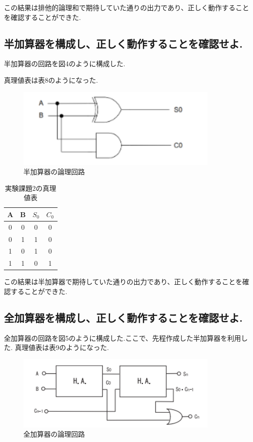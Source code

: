 \documentclass[titlepage]{jsarticle}
\theoremstyle{definition}
\begin{document}
この結果は排他的論理和で期待していた通りの出力であり、正しく動作することを確認することができた.

\subsection{半加算器を構成し、正しく動作することを確認せよ.}
半加算器の回路を図4のように構成した.

真理値表は表8のようになった.

\begin{figure}[htbp]
	\begin{center}
		\includegraphics[width=100mm]{half_adder.png}
		\caption{半加算器の論理回路}
	\end{center}
\end{figure}


\begin{table}[htbp]
	\caption{実験課題2の真理値表}
	\centering
	\begin{tabular}{|c|c||c|c|} \hline
		A & B & $S_0$ & $C_0$ \\ \hline \hline
		0 & 0 & 0 & 0 \\ \hline
		0 & 1 & 1 & 0 \\ \hline
		1 & 0 & 1 & 0 \\ \hline
		1 & 1 & 0 & 1 \\ \hline
	\end{tabular}
\end{table}

この結果は半加算器で期待していた通りの出力であり、正しく動作することを確認することができた.

\subsection{全加算器を構成し、正しく動作することを確認せよ.}
全加算器の回路を図5のように構成した.ここで、先程作成した半加算器を利用した.
真理値表は表9のようになった.

\begin{figure}[htbp]
	\begin{center}
		\includegraphics[width=100mm]{full_adder.png}
		\caption{全加算器の論理回路}
	\end{center}
\end{figure}
\end{document}
